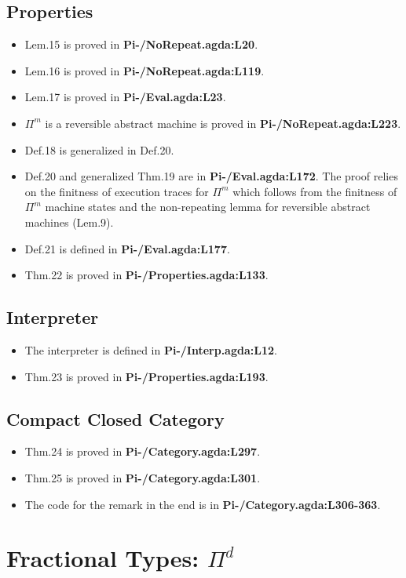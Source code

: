 \documentclass{article}
\begin{document}
\subsection{Properties}
\begin{itemize}
\item Lem.15 is proved in \textbf{Pi-/NoRepeat.agda:L20}.
\item Lem.16 is proved in \textbf{Pi-/NoRepeat.agda:L119}.
\item Lem.17 is proved in \textbf{Pi-/Eval.agda:L23}.
\item $\Pi^m$ is a reversible abstract machine is proved in \textbf{Pi-/NoRepeat.agda:L223}.
\item Def.18 is generalized in Def.20.
\item Def.20 and generalized Thm.19 are in
  \textbf{Pi-/Eval.agda:L172}. The proof relies on the finitness of
  execution traces  for $\Pi^m$ which follows from the finitness of
  $\Pi^m$ machine states and the non-repeating lemma for reversible abstract
  machines (Lem.9).
\item Def.21 is defined in \textbf{Pi-/Eval.agda:L177}.
\item Thm.22 is proved in \textbf{Pi-/Properties.agda:L133}.
\end{itemize}

\subsection{Interpreter}
\begin{itemize}
\item The interpreter is defined in \textbf{Pi-/Interp.agda:L12}.
\item Thm.23 is proved in \textbf{Pi-/Properties.agda:L193}.
\end{itemize}

\subsection{Compact Closed Category}
\begin{itemize}
\item Thm.24 is proved in \textbf{Pi-/Category.agda:L297}.
\item Thm.25 is proved in \textbf{Pi-/Category.agda:L301}.
\item The code for the remark in the end is in \textbf{Pi-/Category.agda:L306-363}.
\end{itemize}

\section{Fractional Types: $\Pi^d$}
\end{document}
